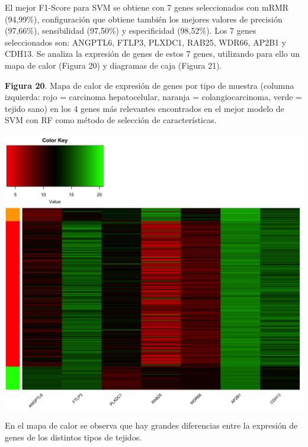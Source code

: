 El mejor F1-Score para SVM se obtiene con 7 genes seleccionados con mRMR (94,99\%), configuración que obtiene también los mejores valores de precisión (97,66\%), sensibilidad (97,50\%) y especificidad (98,52\%). Los 7 genes seleccionados son: ANGPTL6, FTLP3, PLXDC1, RAB25, WDR66, AP2B1 y CDH13. Se analiza la expresión de genes de estos 7 genes, utilizando para ello un mapa de calor (Figura 20) y diagramas de caja (Figura 21).

\newpage
\textbf{Figura 20}. Mapa de calor de expresión de genes por tipo de muestra (columna izquierda: rojo = carcinoma hepatocelular, naranja = colangiocarcinoma, verde = tejido sano) en los 4 genes más relevantes encontrados en el mejor modelo de SVM con RF como método de selección de características.
\begin{center}
	\includegraphics[width=1\textwidth]{figuras/20_higado_multiclase_13_svm_heatmap_mejor_metodo.png} 
\end{center}

En el mapa de calor se observa que hay grandes diferencias entre la expresión de genes de los distintos tipos de tejidos.

